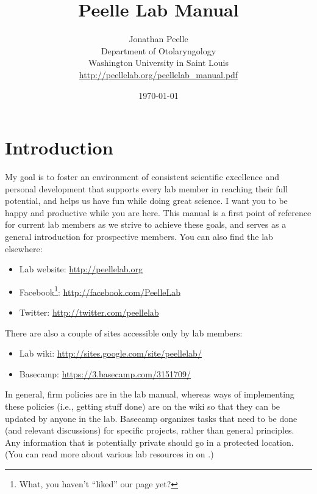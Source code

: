 \documentclass[letterpaper,12pt,oneside]{memoir}
\begin{document}
\title{Peelle Lab Manual}
\author{Jonathan Peelle\\Department of Otolaryngology\\Washington University in Saint Louis\\ \url{http://peellelab.org/peellelab_manual.pdf}}
\date{\today}

\maketitle

\pagestyle{titlingpage}


\cleardoublepage
\frontmatter
\tableofcontents*
\cleardoublepage

\mainmatter

\pagestyle{headings}

\chapter{Introduction}

My goal is to foster an environment of consistent scientific excellence and personal development that supports every lab member in reaching their full potential, and helps us have fun while doing great science. I want you to be happy and productive while you are here. This manual is a first point of reference for current lab members as we strive to achieve these goals, and serves as a general introduction for prospective members. You can also find the lab elsewhere:

\begin{itemize}
\item Lab website: \url{http://peellelab.org}
\item Facebook\footnote{What, you haven't ``liked'' our page yet?}: \url{http://facebook.com/PeelleLab}
\item Twitter: \url{http://twitter.com/peellelab}
\end{itemize}

\noindent There are also a couple of sites accessible only by lab members:

\begin{itemize}
\item Lab wiki: \url{http://sites.google.com/site/peellelab/}
\item Basecamp: \url{https://3.basecamp.com/3151709/}
\end{itemize}

In general, firm policies are in the lab manual, whereas ways of implementing these policies (i.e., getting stuff done) are on the wiki so that they can be updated by anyone in the lab. Basecamp organizes tasks that need to be done (and relevant discussions) for specific projects, rather than general principles. Any information that is potentially private should go in a protected location. (You can read more about various lab resources in  on .)
\end{document}
